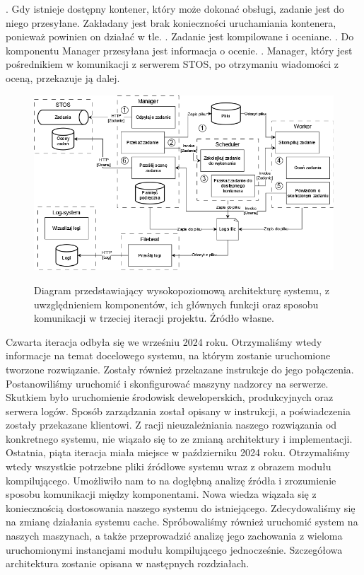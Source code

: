 \newline {}. Gdy istnieje dostępny kontener, który może dokonać obsługi, zadanie jest do niego przesyłane. Zakładany jest brak konieczności uruchamiania kontenera, ponieważ powinien on działać w tle.
\newline {}. Zadanie jest kompilowane i oceniane.
\newline {}. Do komponentu Manager przesyłana jest informacja o ocenie.
\newline {}. Manager, który jest pośrednikiem w komunikacji z serwerem STOS, po otrzymaniu wiadomości z oceną, przekazuje ją dalej.
\begin{figure}[!h]
	\begin{center}
		\resizebox{1.0\textwidth}{!} {
			\includegraphics{img/1/i3_arch.png}
		}
		\caption[Architektura po trzeciej iteracji]{Diagram przedstawiający wysokopoziomową architekturę systemu, z uwzględnieniem komponentów, ich głównych funkcji oraz sposobu komunikacji w trzeciej iteracji projektu. Źródło własne.}
	\end{center}
\end{figure}
\newline \indent Czwarta iteracja odbyła się we wrześniu 2024 roku. Otrzymaliśmy wtedy informacje na temat docelowego systemu, na którym zostanie uruchomione tworzone rozwiązanie. Zostały również przekazane instrukcje do jego połączenia. Postanowiliśmy uruchomić i skonfigurować maszyny nadzorcy na serwerze. Skutkiem było uruchomienie środowisk deweloperskich, produkcyjnych oraz serwera logów. Sposób zarządzania został opisany w instrukcji, a poświadczenia zostały przekazane klientowi. Z racji nieuzależniania naszego rozwiązania od konkretnego systemu, nie wiązało się to ze zmianą architektury i implementacji. 
\newline \indent Ostatnia, piąta iteracja miała miejsce w październiku 2024 roku. Otrzymaliśmy wtedy wszystkie potrzebne pliki źródłowe systemu wraz z obrazem modułu kompilującego. Umożliwiło nam to na dogłębną analizę źródła i zrozumienie sposobu komunikacji między komponentami. Nowa wiedza wiązała się z koniecznością dostosowania naszego systemu do istniejącego. Zdecydowaliśmy się na zmianę działania systemu cache. Spróbowaliśmy również uruchomić system na naszych maszynach, a także przeprowadzić analizę jego zachowania z wieloma uruchomionymi instancjami modułu kompilującego jednocześnie. Szczegółowa architektura zostanie opisana w następnych rozdziałach.